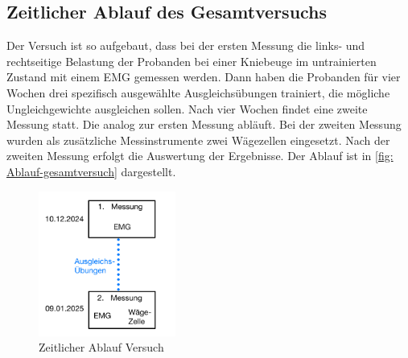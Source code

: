 \subsection{Zeitlicher Ablauf des Gesamtversuchs}
Der Versuch ist so aufgebaut, dass bei der ersten Messung die links- und rechtseitige Belastung der Probanden bei einer Kniebeuge im untrainierten Zustand mit einem EMG gemessen werden. 
Dann haben die Probanden für vier Wochen drei spezifisch ausgewählte Ausgleichsübungen trainiert, die mögliche Ungleichgewichte ausgleichen sollen. 
Nach vier Wochen findet eine zweite Messung statt. Die analog zur ersten Messung abläuft. Bei der zweiten Messung wurden als zusätzliche Messinstrumente zwei Wägezellen eingesetzt. 
Nach der zweiten Messung erfolgt die Auswertung der Ergebnisse. 
Der Ablauf ist in \autoref{fig: Ablauf-gesamtversuch} dargestellt. 
\begin{figure}[h!]
    \centering
    \includegraphics[width=0.4\textwidth]{img/Ablauf-gesamtversuch.jpeg}
    \caption{Zeitlicher Ablauf Versuch}
    \label{fig: Ablauf-gesamtversuch}
\end{figure}
\\
\\ 
